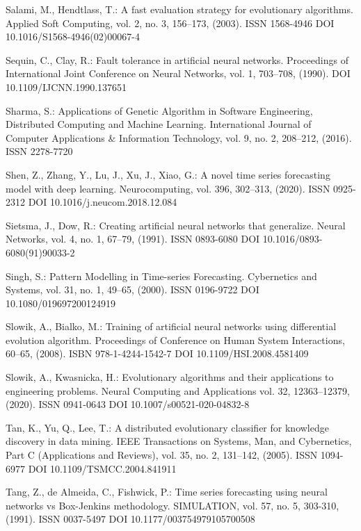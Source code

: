 \begin{thebibliography}{99.}
 Salami, M., Hendtlass, T.: A fast evaluation strategy for evolutionary algorithms. Applied Soft Computing, vol. 2, no. 3, 156--173, (2003). ISSN 1568-4946 DOI 10.1016/S1568-4946(02)00067-4

 Sequin, C., Clay, R.: Fault tolerance in artificial neural networks. Proceedings of International Joint Conference on Neural Networks, vol. 1, 703--708, (1990). DOI 10.1109/IJCNN.1990.137651

 Sharma, S.: Applications of Genetic Algorithm in Software Engineering, Distributed Computing and Machine Learning. International Journal of Computer Applications \& Information Technology, vol. 9, no. 2, 208--212, (2016). ISSN 2278-7720

 Shen, Z., Zhang, Y., Lu, J., Xu, J., Xiao, G.: A novel time series forecasting model with deep learning. Neurocomputing, vol. 396, 302--313, (2020). ISSN 0925-2312 DOI 10.1016/j.neucom.2018.12.084

 Sietsma, J., Dow, R.: Creating artificial neural networks that generalize. Neural Networks, vol. 4, no. 1, 67--79, (1991). ISSN 0893-6080 DOI 10.1016/0893-6080(91)90033-2

 Singh, S.: Pattern Modelling in Time-series Forecasting. Cybernetics and Systems, vol. 31, no. 1, 49--65, (2000). ISSN 0196-9722 DOI 10.1080/019697200124919

 Slowik, A., Bialko, M.: Training of artificial neural networks using differential evolution algorithm. Proceedings of Conference on Human System Interactions, 60--65, (2008). ISBN 978-1-4244-1542-7 DOI 10.1109/HSI.2008.4581409

 Slowik, A., Kwasnicka, H.: Evolutionary algorithms and their applications to engineering problems. Neural Computing and Applications vol. 32, 12363--12379, (2020). ISSN 0941-0643 DOI 10.1007/s00521-020-04832-8

 Tan, K., Yu, Q., Lee, T.: A distributed evolutionary classifier for knowledge discovery in data mining. IEEE Transactions on Systems, Man, and Cybernetics, Part C (Applications and Reviews), vol. 35, no. 2, 131--142, (2005). ISSN 1094-6977 DOI 10.1109/TSMCC.2004.841911

 Tang, Z., de Almeida, C., Fishwick, P.: Time series forecasting using neural networks vs Box-Jenkins methodology. SIMULATION, vol. 57, no. 5, 303-310, (1991). ISSN 0037-5497 DOI 10.1177/003754979105700508


\end{thebibliography}

